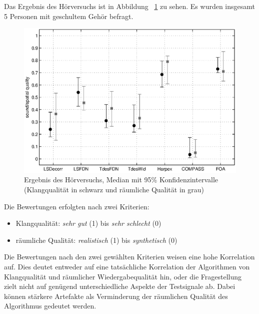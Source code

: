 Das Ergebnis des Hörversuchs ist in Abbildung ~\ref{fig:versuch} zu sehen. Es wurden insgesamt 5 Personen mit geschultem Gehör befragt.

\begin{figure}[!ht]
  \centering
  \includegraphics[width=1\textwidth]{ergebnis/plots/result.eps}
  \caption{Ergebnis des Hörversuchs, Median mit 95\% Konfidenzintervalle (Klangqualität in schwarz und räumliche Qualität in grau)}
  \label{fig:versuch}
\end{figure}

Die Bewertungen erfolgten nach zwei Kriterien:

\begin{itemize}
  \item Klangqualität: \textit{sehr gut} (1) bis \textit{sehr schlecht} (0)
  \item räumliche Qualität: \textit{realistisch} (1) bis \textit{synthetisch} (0)
\end{itemize}

Die Bewertungen nach den zwei gewählten Kriterien weisen eine hohe Korrelation auf. Dies deutet entweder auf eine tatsächliche Korrelation der Algorithmen von Klangqualität und räumlicher Wiedergabequalität hin, oder die Fragestellung zielt nicht auf genügend unterschiedliche Aspekte der Testsignale ab. Dabei können stärkere Artefakte als Verminderung der räumlichen Qualität des Algorithmus gedeutet werden.
